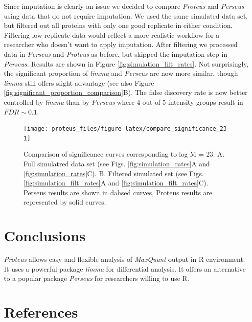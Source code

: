 \documentclass[]{article}
\begin{document}
Since imputation is clearly an issue we decided to compare
\emph{Proteus} and \emph{Perseus} using data that do not require
imputation. We used the same simulated data set, but filtered out all
proteins with only one good replicate in either condition. Filtering
low-replicate data would reflect a more realistic workflow for a
researcher who doesn't want to apply imputation. After filtering we
processed data in \emph{Perseus} and \emph{Proteus} as before, but
skipped the imputation step in \emph{Perseus}. Results are shown in
Figure \ref{fig:simulation_filt_rates}. Not surprisingly, the
significant proportion of \emph{limma} and \emph{Perseus} are now more
similar, though \emph{limma} still offers slight advantage (see also
Figure \ref{fig:significant_proportion_comparison}B). The false
discovery rate is now better controlled by \emph{limma} than by
\emph{Perseus} where 4 out of 5 intensity groups result in
\(FDR \sim 0.1\).

\begin{figure}[H]

{\centering \texttt{[image: proteus\_files/figure-latex/compare\_significance\_23-1]} 

}

\caption{\label{fig:significant_proportion_comparison}Comparison of significance curves corresponding to log M = 23. A. Full simulatred data set (see Figs. \ref{fig:simulation_rates}A and  \ref{fig:simulation_rates}C). B. Filtered simulated set (see Figs. \ref{fig:simulation_filt_rates}A and \ref{fig:simulation_filt_rates}C). Perseus results are shown in dahsed curves, Proteus results are represented by solid curves.}\label{fig:compare_significance_23}
\end{figure}

\section{Conclusions}\label{conclusions}

\emph{Proteus} allows easy and flexible analysis of \emph{MaxQuant}
output in R environment. It uses a powerful package \emph{limma} for
differential analysis. It offers an alternative to a popular package
\emph{Perseus} for researchers willing to use R.

\section*{References}\label{references}
\end{document}

